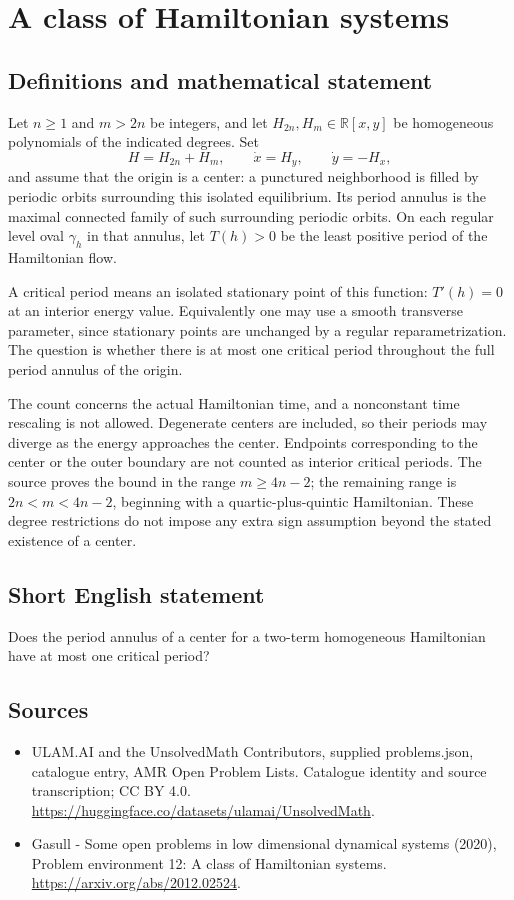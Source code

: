 \documentclass[11pt,a4paper]{article}
\begin{document}
\section*{A class of Hamiltonian systems}\label{statement}

\subsection{Definitions and mathematical statement}
Let $n\ge1$ and $m>2n$ be integers, and let $H_{2n},H_m\in\mathbb R[x,y]$
be homogeneous polynomials of the indicated degrees. Set
\[
 H=H_{2n}+H_m,\qquad \dot x=H_y,\qquad \dot y=-H_x,
\]
and assume that the origin is a center: a punctured neighborhood is filled
by periodic orbits surrounding this isolated equilibrium. Its period
annulus is the maximal connected family of such surrounding periodic orbits.
On each regular level oval $\gamma_h$ in that annulus, let
$T(h)>0$ be the least positive period of the Hamiltonian flow.

A critical period means an isolated stationary point of this function:
$T'(h)=0$ at an interior energy value. Equivalently one may use a smooth
transverse parameter, since stationary points are unchanged by a regular
reparametrization. The question is whether there is at most one critical
period throughout the full period annulus of the origin.

The count concerns the actual Hamiltonian time, and a nonconstant time
rescaling is not allowed. Degenerate centers are included, so their periods
may diverge as the energy approaches the center. Endpoints corresponding to
the center or the outer boundary are not counted as interior critical
periods. The source proves the bound in the range $m\ge4n-2$; the remaining
range is $2n<m<4n-2$, beginning with a quartic-plus-quintic Hamiltonian.
These degree restrictions do not impose any extra sign assumption beyond
the stated existence of a center.
\subsection{Short English statement}
Does the period annulus of a center for a two-term homogeneous Hamiltonian have at most one critical period?
\subsection{Sources}
\begin{itemize}
\item[S1] ULAM.AI and the UnsolvedMath Contributors, supplied problems.json, catalogue entry, AMR Open Problem Lists. Catalogue identity and source transcription; CC BY 4.0.
\url{https://huggingface.co/datasets/ulamai/UnsolvedMath}.
\item[S2] Gasull - Some open problems in low dimensional dynamical systems (2020), Problem environment 12: A class of Hamiltonian systems. 
\url{https://arxiv.org/abs/2012.02524}.
\end{itemize}
\end{document}
